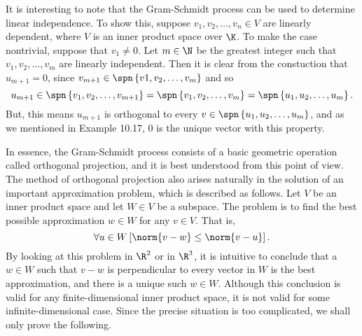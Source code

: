 \documentclass[linearalgebra]{subfiles}
\begin{document}
    \begin{remark}
        It is interesting to note that the Gram-Schmidt process can be used to determine linear independence. To show this, suppose $v_1,v_2,\ldots,v_n\in V$ are linearly dependent, where $V$ is an inner product space over $\K$. To make the case nontrivial, suppose that $v_1\neq 0$. Let $m\in\N$ be the greatest integer such that $v_1,v_2,\ldots,v_m$ are linearly independent. Then it is clear from the constuction that $u_{m+1} = 0$, since $v_{m+1}\in\spn\left\lbrace v1,v_2,\ldots,v_m \right\rbrace$ and so
        \begin{equation*}
            u_{m+1}\in \spn\left\lbrace v_1,v_2,\ldots,v_{m+1} \right\rbrace = \spn\left\lbrace v_1,v_2,\ldots,v_m \right\rbrace = \spn\left\lbrace u_1,u_2,\ldots,u_m \right\rbrace .
        \end{equation*}
        But, this means $u_{m+1}$ is orthogonal to every $v\in\spn\left\lbrace u_1,u_2,\ldots,u_m \right\rbrace$, and as we mentioned in Example 10.17, $0$ is the unique vector with this property.
    \end{remark}

    \begin{remark}
        In essence, the Gram-Schmidt process consists of a basic geometric operation called orthogonal projection, and it is best understood from this point of view. The method of orthogonal projection also arises naturally in the solution of an important approximation problem, which is described as follows. Let $V$ be an inner product space and let $W\in V$ be a subspace. The problem is to find the best possible approximation $w\in W$ for any $v\in V$. That is,
        \begin{equation*}
            \forall u\in W\left[ \norm{v-w}\leq \norm{v-u} \right].
        \end{equation*}
        By looking at this problem in $\R^2$ or in $\R^3$, it is intuitive to conclude that a $w\in W$ such that $v-w$ is perpendicular to every vector in $W$ is the best approximation, and there is a unique such $w\in W$. Although this conclusion is valid for any finite-dimensional inner product space, it is not valid for some infinite-dimensional case. Since the precise situation is too complicated, we shall only prove the following.
    \end{remark}
\end{document}
